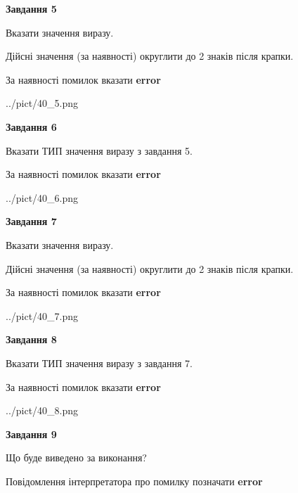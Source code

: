 \documentclass[11pt, ukrainian]{article}
\begin{document}
{\begin {large}
{\begin {center}\textbf{Завдання 5}\end {center}}\par
Вказати значення виразу. \par
Дійсні значення (за наявності) округлити до 2 знаків після крапки. \par
За наявності помилок вказати \textbf{error}

\begin{center}
	{../pict/40_5.png}
\end{center}
\newpage

{\begin {center}\textbf{Завдання 6}\end {center}}\par
Вказати ТИП значення виразу з завдання 5. \par
За наявності помилок вказати \textbf{error}

\begin{center}
	{../pict/40_6.png}
\end{center}
\newpage

{\begin {center}\textbf{Завдання 7}\end {center}}\par
Вказати значення виразу. \par
Дійсні значення (за наявності) округлити до 2 знаків після крапки. \par
За наявності помилок вказати \textbf{error}

\begin{center}
	{../pict/40_7.png}
\end{center}
\newpage

{\begin {center}\textbf{Завдання 8}\end {center}}\par
Вказати ТИП значення виразу з завдання 7. \par
За наявності помилок вказати \textbf{error}

\begin{center}
	{../pict/40_8.png}
\end{center}
\newpage

{\begin {center}\textbf{Завдання 9}\end {center}}\par
Що буде виведено за виконання? \par
Повідомлення інтерпретатора про помилку позначати \textbf{error}


\end{large}}
\end{document}
